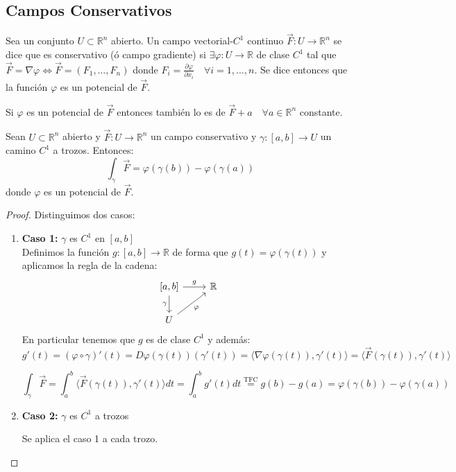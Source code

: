 \subsection{Campos Conservativos}

\begin{definición}
Sea un conjunto $U  \subset \mathbb{R}^n$ abierto. Un campo vectorial-$C^1$ continuo $\vec{F}: U \to \mathbb{R}^n$ se dice que es conservativo (ó campo gradiente) si $\exists \varphi: U \to \mathbb{R}$ de clase $C^1$ tal que $\vec{F} = \nabla \varphi \iff \vec{F} = (F_1, \ldots, F_n)$ donde $F_i = \frac{\partial \varphi}{\partial x_i} \quad \forall i = 1, \ldots, n$.
Se dice entonces que la función $\varphi$ es un potencial de $\vec{F}$.
\end{definición}

\begin{observación}
Si $\varphi$ es un potencial de $\vec{F}$ entonces también lo es de $\vec{F} + a \quad \forall a \in \mathbb{R}^n$ constante.
\end{observación}

\begin{proposición}
Sean $U \subset \mathbb{R}^n$ abierto y $\vec{F}: U \to \mathbb{R}^n$ un campo conservativo y $\gamma: [a,b] \to U$ un camino $C^1$ a trozos. Entonces:
$$\int_{\gamma} \vec{F} = \varphi(\gamma(b)) - \varphi(\gamma(a))$$
donde $\varphi$ es un potencial de $\vec{F}$.
\end{proposición}

\begin{proof}
    Distinguimos dos casos:
    \begin{enumerate}
        \item \textbf{Caso 1:} $\gamma$ es $C^1$ en $[a,b]$\\
              Definimos la función $g: [a,b] \to \mathbb{R}$ de forma que $g(t) = \varphi(\gamma(t))$ y aplicamos la regla de la cadena:
              \[
                  \begin{tikzcd}
                      {[a,b]} \arrow[d, "\gamma"'] \arrow[r, "g"] & \mathbb{R} \\
                      U \arrow[ru, "\varphi"']
                  \end{tikzcd}
              \]
              En particular tenemos que $g$ es de clase $C^1$ y además:
              \[
                  g'(t) = (\varphi \circ \gamma)'(t) = D\varphi (\gamma(t)) (\gamma'(t)) = \langle \nabla \varphi (\gamma(t)), \gamma'(t) \rangle = \langle \vec{F}(\gamma(t)), \gamma'(t) \rangle
              \]

              \[
                  \int_{\gamma} \vec{F} = \int_{a}^{b} \langle \vec{F} (\gamma(t)), \gamma'(t) \rangle dt = \int_{a}^{b} g'(t) dt \overset{\text{TFC}}{=} g(b) - g(a) = \varphi (\gamma(b)) - \varphi (\gamma(a))
              \]

        \item \textbf{Caso 2:} \(\gamma\) es \(C^1\) a trozos

              Se aplica el caso 1 a cada trozo.
    \end{enumerate}
\end{proof}

